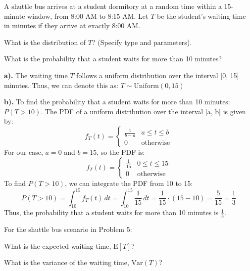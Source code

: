 \documentclass[a4paper, 10pt]{article}
\begin{document}
\begin{problem}
A shuttle bus arrives at a student dormitory at a random time within a 15-minute window, from 8:00 AM to 8:15 AM.
Let \( T \) be the student's waiting time in minutes if they arrive at exactly 8:00 AM.
\begin{subproblems_alpha}
	\item What is the distribution of \( T \)? (Specify type and parameters).
	\item What is the probability that a student waits for more than 10 minutes?
\end{subproblems_alpha}
\end{problem}

\begin{solution}
	\textbf{a).} The waiting time \( T \) follows a uniform distribution over the interval [0, 15] minutes.
	Thus, we can denote this as: \( \boxed{ T \sim \text{Uniform}(0, 15) } \)

	\myspace

	\textbf{b).} To find the probability that a student waits for more than 10 minutes: \( P(T > 10) \).
	The PDF of a uniform distribution over the interval [a, b] is given by:
	\[
		f_T(t) = \begin{cases}
			\frac{1}{b-a} & a \leq t \leq b  \\
			0             & \text{otherwise}
		\end{cases}
	\]
	For our case, \( a = 0 \) and \( b = 15 \), so the PDF is:
	\[
		f_T(t) = \begin{cases}
			\frac{1}{15} & 0 \leq t \leq 15 \\
			0            & \text{otherwise}
		\end{cases}
	\]
	To find \( P(T > 10) \), we can integrate the PDF from 10 to 15:
	\[
		P(T > 10) = \int_{10}^{15} f_T(t) \, dt = \int_{10}^{15} \frac{1}{15} \, dt = \frac{1}{15} \cdot (15 - 10) = \frac{5}{15} = \frac{1}{3}
	\]
	Thus, the probability that a student waits for more than 10 minutes is \( \boxed{\frac{1}{3}} \).
\end{solution}

\begin{problem}
For the shuttle bus scenario in Problem 5:
\begin{subproblems_alpha}
	\item What is the expected waiting time, \( \text{E}[T] \)?
	\item What is the variance of the waiting time, \( \text{Var}(T) \)?
\end{subproblems_alpha}
\end{problem}
\end{document}
